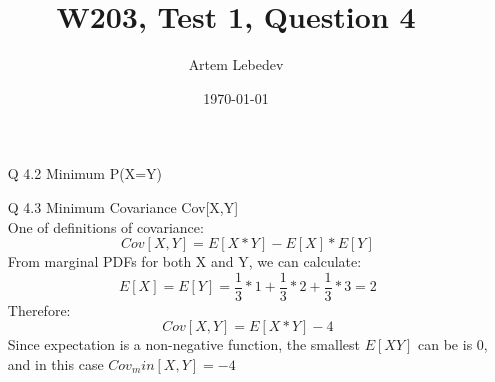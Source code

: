 \documentclass{article}
\author{Artem Lebedev}
\title{W203, Test 1, Question 4}
\date{\today}
\begin{document}
\maketitle

\begin{enumerate}
\item[Q 4.2] Minimum P(X=Y)\\

\item[Q 4.3] Minimum Covariance Cov[X,Y]\\
One of definitions of covariance:
$$ Cov[X,Y] = E[X*Y]-E[X]*E[Y]$$
From marginal PDFs for both X and Y, we can calculate:
$$ E[X] = E[Y] = \frac{1}{3}*1 +  \frac{1}{3}*2  + \frac{1}{3}*3  =2$$
Therefore:
$$ Cov[X,Y] = E[X*Y]-4$$
Since expectation is a non-negative function, the smallest $E[XY]$ can be is 0, and in this case $Cov_min[X,Y] = -4$
\end{enumerate}
\end{document}

